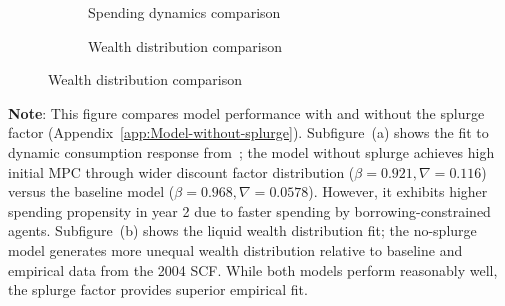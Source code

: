 \documentclass{econsocart}
\begin{document}
\begin{figure}[H]
  \centering
  \caption{\pregenmark Model performance with and without splurge factor}
  \label{fig:splurge0_Norwayestimation} %
  \noindent\begin{minipage}{\textwidth}
    \centering
    \begin{subfigure}[b]{.5\linewidth}
      \centering
      \caption{Spending dynamics comparison}
      \label{fig:aggmpclotterywin_splurge0} %
    \end{subfigure}
    \begin{subfigure}[b]{.5\linewidth}
      \centering
      \caption{Wealth distribution comparison}
      \label{fig:liquwealthdistribution_splurge0} %
    \end{subfigure}
  \end{minipage}
\end{figure}
\noindent\parbox{\textwidth}{
  \medskip
  \footnotesize \textbf{Note}: This figure compares model performance with and without the splurge factor (Appendix~\ref{app:Model-without-splurge}).
  Subfigure~(a) shows the fit to dynamic consumption response from~\cite{fagereng-mpc-2021};
  the model without splurge achieves high initial MPC through wider discount factor distribution
  ($\beta = 0.921, \nabla = 0.116$) versus the baseline model ($\beta = 0.968, \nabla = 0.0578$).
  However, it exhibits higher spending propensity in year 2 due to faster spending by borrowing-constrained agents.
  Subfigure~(b) shows the liquid wealth distribution fit; the no-splurge model generates
  more unequal wealth distribution relative to baseline and empirical data from the 2004 SCF.
  While both models perform reasonably well, the splurge factor provides superior empirical fit.
}
\medskip\medskip

\end{document}
